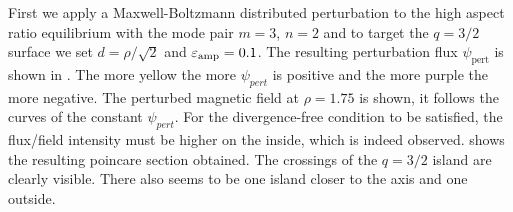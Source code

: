 First we apply a Maxwell-Boltzmann distributed perturbation to the high aspect ratio equilibrium with the mode pair $m=3$, $n=2$ and to target the $q = 3/2$ surface we set $d = \rho/\sqrt{2}$ and $\varepsilon_\text{amp} = 0.1$. The resulting perturbation flux $\psi_\text{pert}$ is shown in . The more yellow the more $\psi_{pert}$ is  positive and the more purple the more negative. The perturbed magnetic field at $\rho=1.75$ is shown, it follows the curves of the constant $\psi_{pert}$. For the divergence-free condition to be satisfied, the flux/field intensity must be higher on the inside, which is indeed observed.  shows the resulting poincare section obtained. The crossings of the $q = 3/2$ island are clearly visible. There also seems to be one island closer to the axis and one outside.

